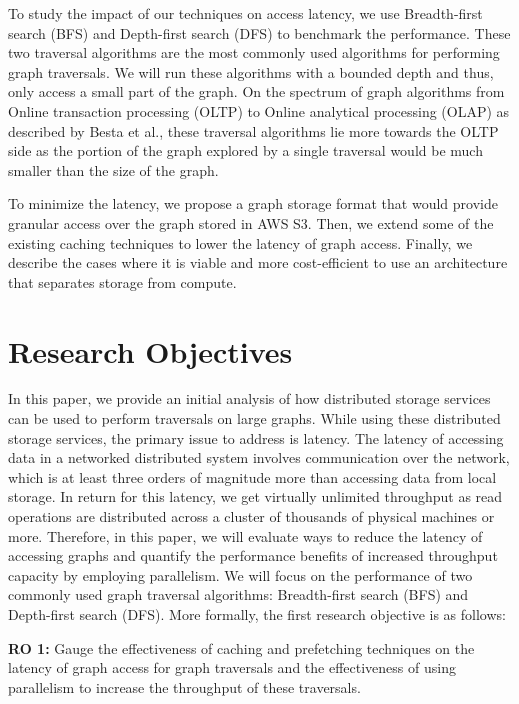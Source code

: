 \medskip
To study the impact of our techniques on access latency, we use
Breadth-first search (BFS) and Depth-first search (DFS) to
benchmark the performance. These two traversal algorithms are the most
commonly used algorithms for performing graph traversals\cite{sahu2017ubiquity}.
We will run these algorithms with a bounded depth and thus, only
access a small part of the graph. On the spectrum of graph algorithms from
Online transaction processing (OLTP)
to Online analytical processing (OLAP) as described by 
Besta et al.\cite{besta2023demystifying}, these 
traversal algorithms lie
more towards the OLTP side as the portion of the graph explored by a single traversal
would be much smaller than the size of the graph.

\medskip
To minimize the latency, we propose a graph storage format that
would provide granular access over the graph stored in AWS S3. Then, we
extend some of the existing caching techniques to lower the latency of
graph access. Finally, we describe the cases where it is viable and more
cost-efficient to use an architecture that separates storage from compute.

\section{Research Objectives}
In this paper, we provide an initial analysis of how distributed storage services can 
be used to perform traversals on large graphs. While using these distributed storage services, the primary
issue to address is latency. The latency of accessing data in a networked
distributed system involves communication over the network, which is at least three orders of
magnitude more than accessing data from local storage. In return for this latency,
we get virtually unlimited throughput as read operations are distributed across a cluster 
of thousands of physical machines or more. Therefore, in this paper, we will evaluate ways to
reduce the latency of accessing graphs and quantify the performance
benefits of increased throughput capacity by employing parallelism. We will focus on the 
performance of two commonly used graph traversal algorithms: Breadth-first search 
(BFS) and Depth-first search (DFS). More formally, the first research
objective is as follows:
\begin{displayquote}
    \textbf{RO 1:} Gauge the effectiveness of caching and prefetching techniques
    on the latency of graph access for graph traversals and the effectiveness of
    using parallelism to increase the throughput of these traversals.
\end{displayquote}

